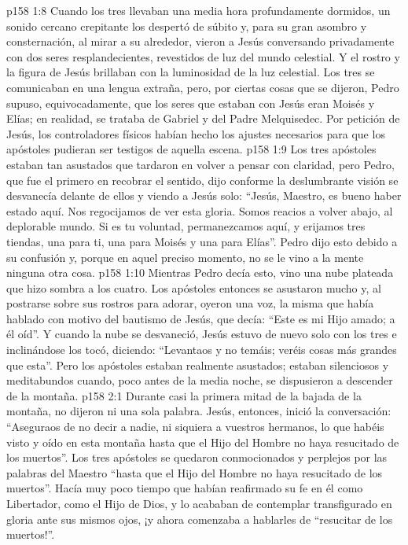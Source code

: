 \vs p158 1:8 Cuando los tres llevaban una media hora profundamente dormidos, un sonido cercano crepitante los despertó de súbito y, para su gran asombro y consternación, al mirar a su alrededor, vieron a Jesús conversando privadamente con dos seres resplandecientes, revestidos de luz del mundo celestial. Y el rostro y la figura de Jesús brillaban con la luminosidad de la luz celestial. Los tres se comunicaban en una lengua extraña, pero, por ciertas cosas que se dijeron, Pedro supuso, equivocadamente, que los seres que estaban con Jesús eran Moisés y Elías; en realidad, se trataba de Gabriel y del Padre Melquisedec. Por petición de Jesús, los controladores físicos habían hecho los ajustes necesarios para que los apóstoles pudieran ser testigos de aquella escena.
\vs p158 1:9 Los tres apóstoles estaban tan asustados que tardaron en volver a pensar con claridad, pero Pedro, que fue el primero en recobrar el sentido, dijo conforme la deslumbrante visión se desvanecía delante de ellos y viendo a Jesús solo: “Jesús, Maestro, es bueno haber estado aquí. Nos regocijamos de ver esta gloria. Somos reacios a volver abajo, al deplorable mundo. Si es tu voluntad, permanezcamos aquí, y erijamos tres tiendas, una para ti, una para Moisés y una para Elías”. Pedro dijo esto debido a su confusión y, porque en aquel preciso momento, no se le vino a la mente ninguna otra cosa.
\vs p158 1:10 Mientras Pedro decía esto, vino una nube plateada que hizo sombra a los cuatro. Los apóstoles entonces se asustaron mucho y, al postrarse sobre sus rostros para adorar, oyeron una voz, la misma que había hablado con motivo del bautismo de Jesús, que decía: “Este es mi Hijo amado; a él oíd”. Y cuando la nube se desvaneció, Jesús estuvo de nuevo solo con los tres e inclinándose los tocó, diciendo: “Levantaos y no temáis; veréis cosas más grandes que esta”. Pero los apóstoles estaban realmente asustados; estaban silenciosos y meditabundos cuando, poco antes de la media noche, se dispusieron a descender de la montaña.
\vs p158 2:1 Durante casi la primera mitad de la bajada de la montaña, no dijeron ni una sola palabra. Jesús, entonces, inició la conversación: “Aseguraos de no decir a nadie, ni siquiera a vuestros hermanos, lo que habéis visto y oído en esta montaña hasta que el Hijo del Hombre no haya resucitado de los muertos”. Los tres apóstoles se quedaron conmocionados y perplejos por las palabras del Maestro “hasta que el Hijo del Hombre no haya resucitado de los muertos”. Hacía muy poco tiempo que habían reafirmado su fe en él como Libertador, como el Hijo de Dios, y lo acababan de contemplar transfigurado en gloria ante sus mismos ojos, ¡y ahora comenzaba a hablarles de “resucitar de los muertos!”.
